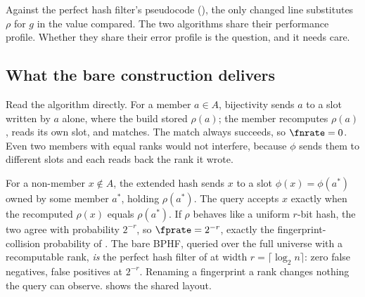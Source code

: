 \begin{algorithm}[ht]
  \caption{BPHF construction and query}
  \label{alg:bphf-build-query}

  \BlankLine
\end{algorithm}

Against the perfect hash filter's pseudocode
(), the only changed line substitutes $\rho$
for $g$ in the value compared. The two
algorithms share their performance profile. Whether they share their
error profile is the question, and it needs care.

\subsection*{What the bare construction delivers}

Read the algorithm directly. For a member $a \in A$, bijectivity sends
$a$ to a slot written by $a$ alone, where the build stored $\rho(a)$; the
member recomputes $\rho(a)$, reads its own slot, and matches. The match
always succeeds, so $\fnrate = 0$. Even two members with equal ranks
would not interfere, because $\phi$ sends them to different slots and
each reads back the rank it wrote.

For a non-member $x \notin A$, the extended hash sends $x$ to a slot
$\phi(x) = \phi(a^{*})$ owned by some member $a^{*}$, holding
$\rho(a^{*})$. The query accepts $x$ exactly when the recomputed
$\rho(x)$ equals $\rho(a^{*})$. If $\rho$ behaves like a uniform $r$-bit
hash, the two agree with probability $2^{-r}$, so $\fprate = 2^{-r}$,
exactly the fingerprint-collision probability of .
The bare BPHF, queried over the full universe with a recomputable rank,
\emph{is} the perfect hash filter of  at width $r = \lceil
\log_2 n \rceil$: zero false negatives, false positives at $2^{-r}$.
Renaming a fingerprint a rank changes nothing the query can observe.
 shows the shared layout.

